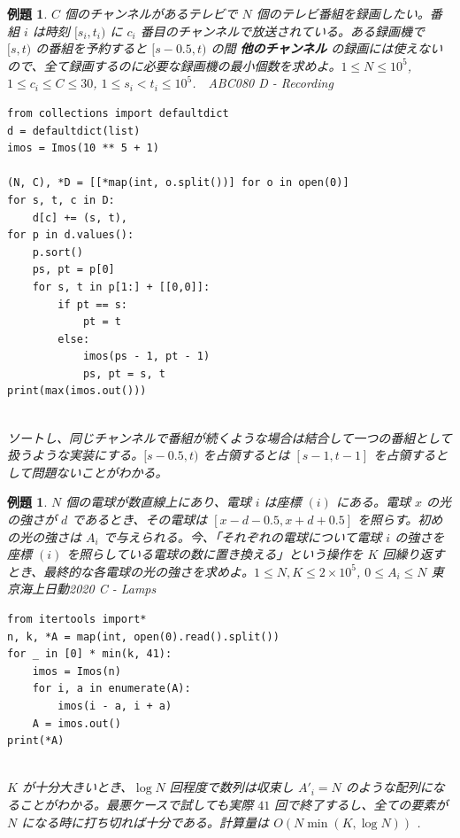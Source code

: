 \documentclass[12pt, a4j]{ltjsarticle}
\newtheorem{exm}[thm]{例題}
\begin{document}
\newpage

\begin{exm} $C$ 個のチャンネルがあるテレビで $N$ 個のテレビ番組を録画したい。番組 $i$ は時刻 $[s_i,t_i)$ に $c_i$ 番目のチャンネルで放送されている。ある録画機で $[s,t)$ の番組を予約すると $[s-0.5,t)$ の間 {\bf 他のチャンネル} の録画には使えないので、全て録画するのに必要な録画機の最小個数を求めよ。$1\le N\le 10^5$, $1\le c_i\le C\le 30$, $1\le s_i < t_i\le 10^5$.\upshape　ABC080 D - Recording\\
\begin{lstlisting}
from collections import defaultdict
d = defaultdict(list)
imos = Imos(10 ** 5 + 1)

(N, C), *D = [[*map(int, o.split())] for o in open(0)]
for s, t, c in D:
    d[c] += (s, t),
for p in d.values():
    p.sort()
    ps, pt = p[0]
    for s, t in p[1:] + [[0,0]]:
        if pt == s:
            pt = t
        else:
            imos(ps - 1, pt - 1)
            ps, pt = s, t
print(max(imos.out()))
\end{lstlisting}
\quad\\
ソートし、同じチャンネルで番組が続くような場合は結合して一つの番組として扱うような実装にする。$[s-0.5,t)$ を占領するとは $[s-1,t-1]$ を占領するとして問題ないことがわかる。
\end{exm}

\vspace{1cm}\newpage

\begin{exm}
$N$ 個の電球が数直線上にあり、電球 $i$ は座標 $(i)$ にある。電球 $x$ の光の強さが $d$ であるとき、その電球は $[x-d-0.5,x+d+0.5]$ を照らす。初めの光の強さは $A_i$ で与えられる。今、「それぞれの電球について電球 $i$ の強さを座標 $(i)$ を照らしている電球の数に置き換える」という操作を $K$ 回繰り返すとき、最終的な各電球の光の強さを求めよ。$1\le N,K\le 2\times10^5$, $0\le A_i\le N$ \quad\upshape 東京海上日動2020 C - Lamps\\
\begin{lstlisting}
from itertools import*
n, k, *A = map(int, open(0).read().split())
for _ in [0] * min(k, 41):
    imos = Imos(n)
    for i, a in enumerate(A):
        imos(i - a, i + a)
    A = imos.out()
print(*A)
\end{lstlisting}\quad\\
$K$ が十分大きいとき、$\log N$ 回程度で数列は収束し $A'_i = N$ のような配列になることがわかる。最悪ケースで試しても実際 $41$ 回で終了するし、全ての要素が $N$ になる時に打ち切れば十分である。計算量は $O(N \min(K, \log N))$ .
\end{exm}
\end{document}
